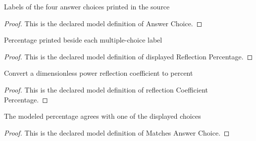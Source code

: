 \begin{definition}
  \label{def:physics:phyx-mini-0307:phyxminiproblems-problemphyxmini0307-answerchoice}
  Labels of the four answer choices printed in the source
\end{definition}
\begin{proof}
  This is the declared model definition of Answer Choice.
\end{proof}
\begin{definition}
  \label{def:physics:phyx-mini-0307:phyxminiproblems-problemphyxmini0307-displayedreflectionpercentage}
  Percentage printed beside each multiple-choice label
\end{definition}
\begin{proof}
  This is the declared model definition of displayed Reflection Percentage.
\end{proof}
\begin{definition}
  \label{def:physics:phyx-mini-0307:phyxminiproblems-problemphyxmini0307-reflectioncoefficientpercentage}
  Convert a dimensionless power reflection coefficient to percent
\end{definition}
\begin{proof}
  This is the declared model definition of reflection Coefficient Percentage.
\end{proof}
\begin{definition}
  \label{def:physics:phyx-mini-0307:phyxminiproblems-problemphyxmini0307-matchesanswerchoice}
  The modeled percentage agrees with one of the displayed choices
\end{definition}
\begin{proof}
  This is the declared model definition of Matches Answer Choice.
\end{proof}
